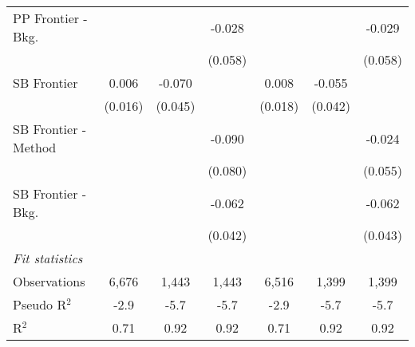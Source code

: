 \begin{tabular}{lcccccc}
   PP Frontier - Bkg.   &               &               & -0.028        &               &               & -0.029\\   
                        &               &               & (0.058)       &               &               & (0.058)\\   
   SB Frontier          & 0.006         & -0.070        &               & 0.008         & -0.055        &   \\   
                        & (0.016)       & (0.045)       &               & (0.018)       & (0.042)       &   \\   
   SB Frontier - Method &               &               & -0.090        &               &               & -0.024\\   
                        &               &               & (0.080)       &               &               & (0.055)\\   
   SB Frontier - Bkg.   &               &               & -0.062        &               &               & -0.062\\   
                        &               &               & (0.042)       &               &               & (0.043)\\   
   \midrule
   \emph{Fit statistics}\\
   Observations         & 6,676         & 1,443         & 1,443         & 6,516         & 1,399         & 1,399\\  
   Pseudo R$^2$         & -2.9          & -5.7          & -5.7          & -2.9          & -5.7          & -5.7\\  
   R$^2$                & 0.71          & 0.92          & 0.92          & 0.71          & 0.92          & 0.92\\  
   

\end{tabular}
